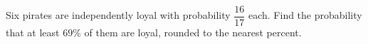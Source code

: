 Six pirates are independently loyal with probability $\dfrac{16}{17}$ each. Find the probability that at least $69\%$ of them are loyal, rounded to the nearest percent.
